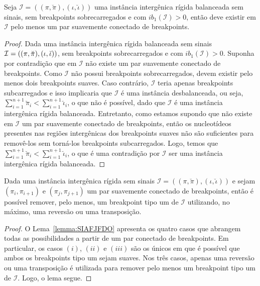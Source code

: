 \begin{lemma}\label{lemma:GZNXMCLB}
Seja $\mathcal{I} = ((\pi,\breve\pi),(\iota,\breve\iota))$ uma instância intergênica rígida balanceada sem sinais, sem breakpoints sobrecarregados e com $ib_1(\mathcal{I}) > 0$, então deve existir em $\mathcal{I}$ pelo menos um par suavemente conectado de breakpoints.
\end{lemma}
\begin{proof}
Dada uma instância intergênica rígida balanceada sem sinais $\mathcal{I}=((\pi,\breve\pi),\break(\iota,\breve\iota))$, sem breakpoints sobrecarregados e com $ib_1(\mathcal{I}) > 0$. Suponha por contradição que em $\mathcal{I}$ não existe um par suavemente conectado de breakpoints. Como $\mathcal{I}$ não possui breakpoints sobrecarregados, devem existir pelo menos dois breakpoints suaves. Caso contrário, $\mathcal{I}$ teria apenas breakpoints subcarregados e isso implicaria que $\mathcal{I}$ é uma instância desbalanceada, ou seja, $\sum_{i=1}^{n+1}\breve\pi_i < \sum_{i=1}^{n+1}\breve\iota_i$, o que não é possível, dado que $\mathcal{I}$ é uma instância intergênica rígida balanceada. Entretanto, como estamos supondo que não existe em  $\mathcal{I}$ um par suavemente conectado de breakpoints, então os nucleotídeos presentes nas regiões intergênicas dos breakpoints suaves não são suficientes para removê-los sem torná-los breakpoints subcarregados. Logo, temos que $\sum_{i=1}^{n+1}\breve\pi_i < \sum_{i=1}^{n+1}\breve\iota_i$, o que é uma contradição por $\mathcal{I}$ ser uma instância intergênica rígida balanceada.
\end{proof}

\begin{lemma}\label{lemma:LRCEAVRZ}
Dada uma instância intergênica rígida sem sinais $\mathcal{I}=((\pi,\breve\pi),(\iota,\breve\iota))$ e sejam $(\pi_i,\pi_{i+1})$ e $(\pi_j,\pi_{j+1})$ um par suavemente conectado de breakpoints, então é possível remover, pelo menos, um breakpoint tipo um de $\mathcal{I}$ utilizando, no máximo, uma reversão ou uma transposição.
\end{lemma}
\begin{proof}
O Lema~\ref{lemma:SIAFJFDO} apresenta os quatro casos que abrangem todas as possibilidades a partir de um par conectado de breakpoints. Em particular, os casos $(i)$, $(ii)$ e $(iii)$ são os únicos em que é possível que ambos os breakpoints tipo um sejam suaves. Nos três casos, apenas uma reversão ou uma transposição é utilizada para remover pelo menos um breakpoint tipo um de $\mathcal{I}$. Logo, o lema segue.
\end{proof}

